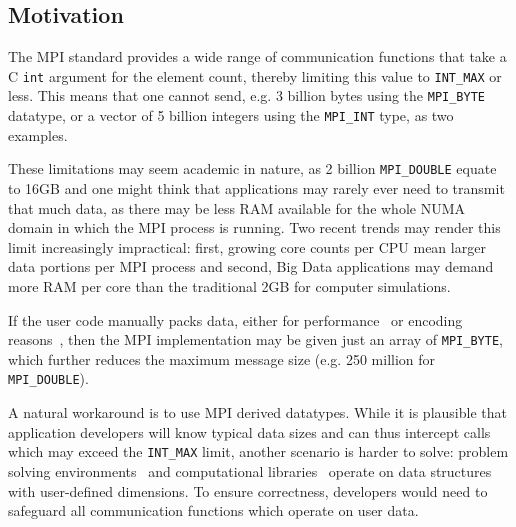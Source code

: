 \subsection{Motivation}

The MPI standard provides a wide range of communication functions that
take a C \texttt{int} argument for the element count, thereby limiting this
value to \texttt{INT\_MAX} or less.
This means that one cannot send, e.g. 3 billion bytes using the \texttt{MPI\_BYTE} 
datatype, or a vector of 5 billion integers using the \texttt{MPI\_INT} type, as
two examples.

These limitations may seem academic in nature, as 2 billion
\texttt{MPI\_DOUBLE} equate to 16GB and one might think that
applications may rarely ever need to transmit that much data, as there
may be less RAM available for the whole NUMA domain in which the MPI
process is running. Two recent trends may render this limit
increasingly impractical: first, growing core counts per CPU mean
larger data portions per MPI process and second, Big Data applications
may demand more RAM per core than the traditional 2GB for computer
simulations.

If the user code manually packs data, either for
performance~\cite{jenkins2012enabling} or encoding
reasons~\cite{boostmpi}, then the MPI implementation may be given just
an array of \texttt{MPI\_BYTE}, which further reduces the maximum
message size (e.g. 250 million for \texttt{MPI\_DOUBLE}).

A natural workaround is to use MPI derived datatypes. While it is
plausible that application developers will know typical data sizes and
can thus intercept calls which may exceed the \texttt{INT\_MAX} limit,
another scenario is harder to solve: problem solving
environments~\cite{cactus:SC01, gromacs} and computational
libraries~\cite{physis, libgeodecomp} operate on data structures with
user-defined dimensions. To ensure correctness, developers would need
to safeguard all communication functions which operate on user data.

%

